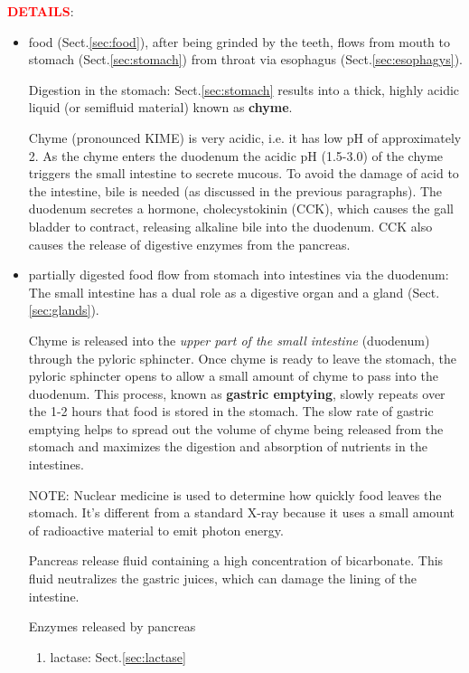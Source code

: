 \textcolor{red}{\bf DETAILS}:
\begin{itemize}
  \item food (Sect.\ref{sec:food}), after being grinded by the teeth, flows from
  mouth to stomach (Sect.\ref{sec:stomach}) from throat via esophagus
  (Sect.\ref{sec:esophagys}).

Digestion in the stomach: Sect.\ref{sec:stomach} results into a thick, highly
acidic liquid (or semifluid material) known as {\bf chyme}.

\begin{mdframed}
\label{sec:chyme}
Chyme  (pronounced KIME) is very acidic, i.e. it has low pH of approximately 2.
As the chyme enters the duodenum the acidic pH (1.5-3.0) of the chyme triggers
the small intestine to secrete mucous. To avoid the damage of acid to the
intestine, bile is needed (as discussed in the previous paragraphs). The
duodenum secretes a hormone, cholecystokinin (CCK), which causes the gall
bladder to contract, releasing alkaline bile into the duodenum.
CCK also causes the release of digestive enzymes from the pancreas.
\end{mdframed}

  \item partially digested food flow from stomach into intestines via the
  duodenum: The small intestine has a dual role as a digestive organ and a gland
   (Sect.\ref{sec:glands}).

Chyme is released into the {\it upper part of the small intestine} (duodenum)
through the pyloric sphincter. Once chyme is ready to leave the stomach, the pyloric
sphincter opens to allow a small amount of chyme to pass into the duodenum. This
process, known as {\bf gastric emptying}, slowly repeats over the 1-2 hours that
food is stored in the stomach.
The slow rate of gastric emptying helps to spread out the volume of chyme being
released from the stomach and maximizes the digestion and absorption of
nutrients in the intestines.

NOTE: Nuclear medicine is used to determine how quickly food leaves the stomach.
It's different from a standard X-ray because it uses a small amount of
radioactive material to emit photon energy.


Pancreas release fluid containing a high concentration of bicarbonate. This
fluid neutralizes the gastric juices, which can damage the lining of the
intestine. 

Enzymes released by pancreas
\begin{enumerate}
  \item  lactase: Sect.\ref{sec:lactase} 
  

\end{enumerate}
\end{itemize}
